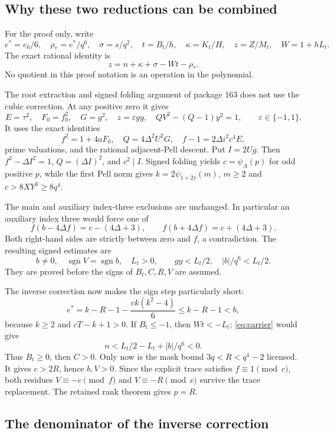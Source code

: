 \documentclass[10pt,letterpaper]{article}
\newcommand{\sgn}{\operatorname{sgn}}
\theoremstyle{remark}\newtheorem{remark}[theorem]{Remark}
\begin{document}
\subsection{Why these two reductions can be combined}

For the proof only, write
\[
 e^*=e_6/6,\quad\rho_*=e^*/q^6,\quad\sigma=s/q^2,
 \quad t=B_t/h,\quad\kappa=K_t/H,\quad z=Z/M_t,
 \quad W=1+hL_t.
\]
The exact rational identity is
\begin{equation}\label{eq:carrier}
 z=n+\kappa+\sigma-Wt-\rho_*.
\end{equation}
No quotient in this proof notation is an operation in the polynomial.

The root extraction and signed folding argument of package 163 does not
use the cubic correction. At any positive zero it gives
\[
 E=\tau^2,\quad F_0=f_0^2,\quad G=g^2,\quad
 z=\varepsilon gy,\quad QV^2-(Q-1)y^2=1,
 \qquad\varepsilon\in\{-1,1\}.
\]
It uses the exact identities
\[
 f^2=1+4aF_0,\quad Q=4\Delta^2U^2G,
 \quad f-1=2\Delta i^2c^4E,
\]
prime valuations, and the rational adjacent-Pell descent. Put $I=2Ug$.
Then $f^2-\Delta I^2=1$, $Q=(\Delta I)^2$, and $c^2\mid I$.
Signed folding yields $c=\psi_A(p)$ for odd positive $p$, while the first
Pell norm gives $k=2\psi_{1+2v}(m)$, $m\ge2$ and $c>8XY^3\ge8q^4$.

The main and auxiliary index-three exclusions are unchanged. In particular
an auxiliary index three would force one of
\[
 f(b-4\Delta f)=c-(4\Delta+3),\qquad
 f(b+4\Delta f)=c+(4\Delta+3).
\]
Both right-hand sides are strictly between zero and $f$, a contradiction.
The resulting signed estimates are
\[
 b\ne0,\quad\sgn V=\sgn b,\quad L_t>0,
 \qquad gy<L_t/2,\quad |b|/q^6<L_t/2.
\]
They are proved before the signs of $B_t,C,R,V$ are assumed.

The inverse correction now makes the sign step particularly short:
\[
 e^*=k-R-1-\frac{vk(k^2-4)}6\le k-R-1<b,
\]
because $k\ge2$ and $cT-k+1>0$. If $B_t\le-1$, then $Wt<-L_t$;
\eqref{eq:carrier} would give
\[
 n< L_t/2-L_t+|b|/q^6<0.
\]
Thus $B_t\ge0$, then $C>0$. Only now is the mask bound
$3q<R<q^4-2$ licensed. It gives $c>2R$, hence $b,V>0$.
Since the explicit trace satisfies $f\equiv1\pmod c$, both residues
$V\equiv-c\pmod f$ and $V\equiv-R\pmod c$ survive the trace replacement.
The retained rank theorem gives $p=R$.

\subsection{The denominator of the inverse correction}
\end{document}
